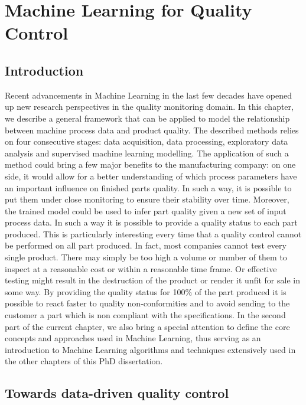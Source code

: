 \chapter{Machine Learning for Quality Control} \label{Machine Learning for Quality Control}
\minitoc

\section{Introduction}

Recent advancements in Machine Learning in the last few decades have opened up new research perspectives in the quality monitoring domain. In this chapter, we describe a general framework that can be applied to model the relationship between machine process data and product quality. The described methods relies on four consecutive stages: data acquisition, data processing, exploratory data analysis and supervised machine learning modelling. The application of such a method could bring a few major benefits to the manufacturing company: on one side, it would allow for a better understanding of which process parameters have an important influence on finished parts quality. In such a way, it is possible to put them under close monitoring to ensure their stability over time. Moreover, the trained model could be used to infer part quality given a new set of input process data. In such a way it is possible to provide a quality status to each part produced. This is particularly interesting every time that a quality control cannot be performed on all part produced. In fact, most companies cannot test every single product. There may simply be too high a volume or number of them to inspect at a reasonable cost or within a reasonable time frame. Or effective testing might result in the destruction of the product or render it unfit for sale in some way. By providing the quality status for 100\% of the part produced it is possible to react faster to quality non-conformities and to avoid sending to the customer a part which is non compliant with the specifications.  In the second part of the current chapter, we also bring a special attention to define the core concepts and approaches used in Machine Learning, thus serving as an introduction to Machine Learning algorithms and techniques extensively used in the other chapters of this PhD dissertation.

\section{Towards data-driven quality control}


